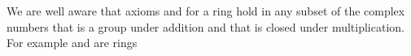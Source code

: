 \documentclass[11pt,oneside]{article}
\begin{document}
\begin{BookBody}
 We are well aware that axioms  and  for a ring hold in any subset of the complex numbers that is a group under addition and that is closed under multiplication. For example and  are rings\BookEnd{\blacktriangle}

\end{BookBody}

\BookNarrativetrue
\end{document}
